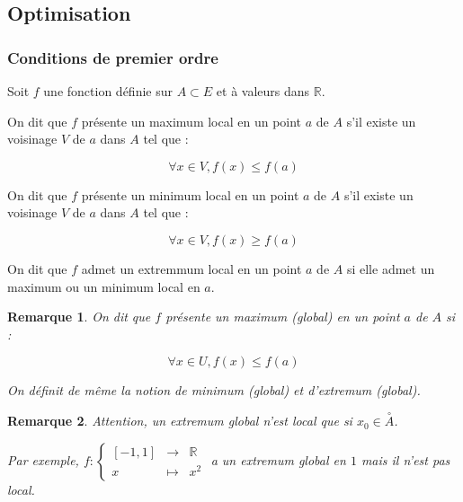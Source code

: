\documentclass[a4paper,12pt]{book}
\newcommand{\Def}[2]{\begin{tcolorbox}[sharp corners, colback=white,colframe=blue!90!black!75, title=Définition : #1]#2\end{tcolorbox}}
\newtheorem{Rem}{Remarque}[section]
\def\R{\mathbb{R}}
\begin{document}
\subsection{Optimisation}
\subsubsection{Conditions de premier ordre}
\Def{}{Soit $f$ une fonction définie sur $A\subset E$ et à valeurs dans $\R$.
\par On dit que $f$ présente un maximum local en un point $a$ de $A$ s'il existe un voisinage $V$ de $a$ dans $A$ tel que :
\par $$\forall x\in V, f(x)\leq f(a)$$
\par On dit que $f$ présente un minimum local en un point $a$ de $A$ s'il existe un voisinage $V$ de $a$ dans $A$ tel que :
\par $$\forall x\in V, f(x)\geq f(a)$$
\par On dit que $f$ admet un extremmum local en un point $a$ de $A$ si elle admet un maximum ou un minimum local en $a$.}
\begin{Rem}
On dit que $f$ présente un maximum (global) en un point $a$ de $A$ si :
\par $$\forall x\in U, f(x)\leq f(a)$$
\par On définit de même la notion de minimum (global) et d'extremum (global). 
\end{Rem}
\begin{Rem}
Attention, un extremum global n'est local que si $x_0\in\overset{\circ}{A}$.
\par Par exemple, $f:\left\{\begin{array}{rcl}[-1, 1] & \to & \R \\ x & \mapsto & x^2\end{array}\right.$ a un extremum global en $1$ mais il n'est pas local.
\end{Rem}
\end{document}

